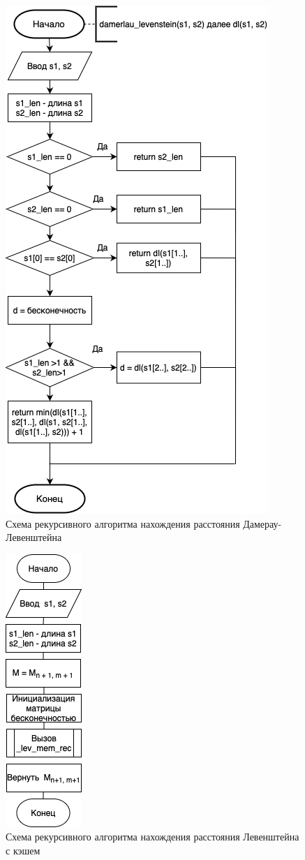 \documentclass[12pt]{report}
\begin{document}
\begin{figure}[h]
	\centering
	\includegraphics[scale=0.85]{dam_lev_rec.png}
	\caption{Схема рекурсивного алгоритма нахождения расстояния Дамерау-Левенштейна}
	\label{fig:rec_dam_lev}
\end{figure}

\begin{figure}[h]
	\centering
	\includegraphics[scale=1]{lev_cache_main.png}
	\caption{Схема рекурсивного алгоритма нахождения расстояния Левенштейна с кэшем}
	\label{fig:rec_lev_cache_main}
\end{figure}
\end{document}
